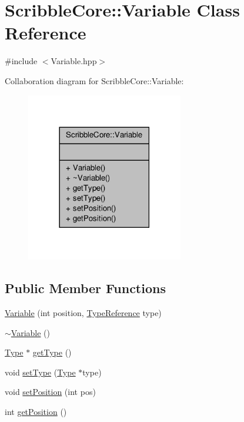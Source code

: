 \hypertarget{class_scribble_core_1_1_variable}{\section{Scribble\-Core\-:\-:Variable Class Reference}
\label{class_scribble_core_1_1_variable}
}


{\ttfamily \#include $<$Variable.\-hpp$>$}



Collaboration diagram for Scribble\-Core\-:\-:Variable\-:
\nopagebreak
\begin{figure}[H]
\begin{center}
\leavevmode
\includegraphics[width=194pt]{class_scribble_core_1_1_variable__coll__graph}
\end{center}
\end{figure}
\subsection*{Public Member Functions}
\begin{DoxyCompactItemize}
\item 
\hyperlink{class_scribble_core_1_1_variable_a9724b5d36cf8944a51ede6dfeee0dd66}{Variable} (int position, \hyperlink{namespace_scribble_core_a0e685a305b14aa5f0504df1369ba270b}{Type\-Reference} type)
\item 
\hyperlink{class_scribble_core_1_1_variable_a4b7563356d81e0235615ca822591b669}{$\sim$\-Variable} ()
\item 
\hyperlink{class_scribble_core_1_1_type}{Type} $\ast$ \hyperlink{class_scribble_core_1_1_variable_a4d57a13af1d015cba3ef0e28d828db29}{get\-Type} ()
\item 
void \hyperlink{class_scribble_core_1_1_variable_a29f45e177ad71942908e691b3fe0fa1f}{set\-Type} (\hyperlink{class_scribble_core_1_1_type}{Type} $\ast$type)
\item 
void \hyperlink{class_scribble_core_1_1_variable_a68827f8ea0b4d415ca6b149de66556a2}{set\-Position} (int pos)
\item 
int \hyperlink{class_scribble_core_1_1_variable_a75795407003815016a7ac4680247d9c2}{get\-Position} ()
\end{DoxyCompactItemize}


